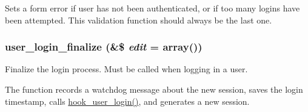 Sets a form error if user has not been authenticated, or if too many logins have been attempted. This validation function should always be the last one. \hypertarget{user_8module_af487aea9565f1a6c896c493c3df9c0b2}{
\subsubsection[{user\_\-login\_\-finalize}]{\setlength{\rightskip}{0pt plus 5cm}user\_\-login\_\-finalize (\&\$ {\em edit} = {\ttfamily array()})}}
\label{user_8module_af487aea9565f1a6c896c493c3df9c0b2}
Finalize the login process. Must be called when logging in a user.

The function records a watchdog message about the new session, saves the login timestamp, calls \hyperlink{group__hooks_ga8cce712a39ee6e57bd506b5a0c457d09}{hook\_\-user\_\-login()}, and generates a new session.


